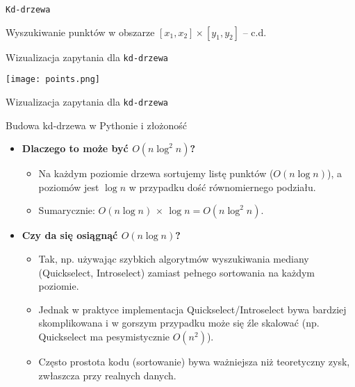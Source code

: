\documentclass[aspectratio=1610, polish]{beamer}
\begin{document}
\begin{section}{\texttt{Kd-drzewa}}
\begin{frame}{Wyszukiwanie punktów w obszarze \([x_1, x_2] \times [y_1, y_2]\) -- c.d.}
\end{frame}
\begin{frame}{Wizualizacja zapytania dla \texttt{kd-drzewa}}
\begin{center}
    \texttt{[image: points.png]}
\end{center}
\end{frame}
\begin{frame}{Wizualizacja zapytania dla \texttt{kd-drzewa}}
        \centering
\end{frame}

\begin{frame}[fragile]{Budowa kd-drzewa w Pythonie i złożoność}
\vspace{0.3em}
\begin{itemize}
    \item \textbf{Dlaczego to może być \(O(n \log^2 n)\)?} 
    \begin{itemize}
      \item Na każdym poziomie drzewa sortujemy listę punktów (\(O(n \log n)\)), 
            a poziomów jest \(\log n\) w przypadku dość równomiernego podziału.
      \item Sumarycznie: \(O(n \log n)\) \(\times\) \(\log n = O(n \log^2 n)\).
    \end{itemize}
    
    \item \textbf{Czy da się osiągnąć \(O(n \log n)\)?} 
    \begin{itemize}
      \item Tak, np. używając szybkich algorytmów wyszukiwania mediany (Quickselect, Introselect) zamiast pełnego sortowania na każdym poziomie.
      \item Jednak w praktyce implementacja Quickselect/Introselect bywa bardziej skomplikowana i w gorszym przypadku może się źle skalować (np. Quickselect ma pesymistycznie \(O(n^2)\)). 
      \item Często prostota kodu (sortowanie) bywa ważniejsza niż teoretyczny zysk, zwłaszcza przy realnych danych.
    \end{itemize}
\end{itemize}


\end{frame}
\end{section}
\end{document}
